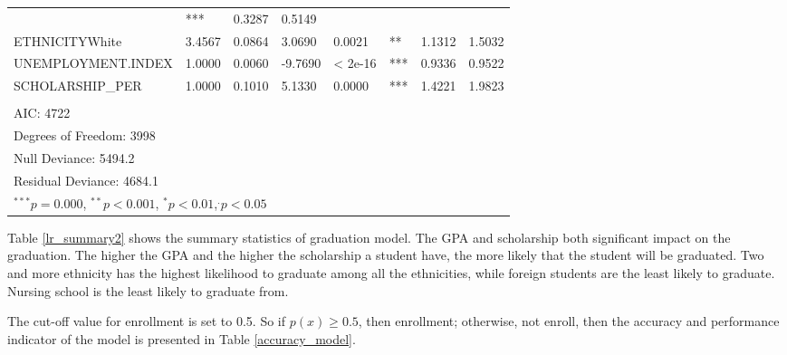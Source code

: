 \documentclass[12pt,english]{report}
\begin{document}
\begin{table}[]
\begin{adjustbox}{width=1.05\textwidth}
\begin{tabular}{llllllll}
& ***         & 0.3287 & 0.5149 \\
ETHNICITYWhite                  & 3.4567   & 0.0864     & 3.0690  & 0.0021     
& **          & 1.1312 & 1.5032 \\
UNEMPLOYMENT.INDEX              & 1.0000   & 0.0060     & -9.7690 & \textless
2e-16     & ***         & 0.9336 & 0.9522 \\
SCHOLARSHIP\_PER                & 1.0000   & 0.1010     & 5.1330  & 0.0000     
& ***         & 1.4221 & 1.9823    \\
\\
AIC: 4722\\
Degrees of Freedom: 3998 \\
Null Deviance:      5494.2 \\
Residual Deviance: 4684.1
\\
\hline
\multicolumn{7}{l}{\scriptsize{$^{***} p=0.000$, $^{**} p<0.001$, $^*
p<0.01$,$^{.}p<0.05$}}

\end{tabular}
\end{adjustbox}
\end{table}


Table \ref{lr_summary2} shows the summary statistics of graduation model. The
GPA and scholarship both significant impact on the graduation. The higher the
GPA and the higher the scholarship a student have, the more likely that the
student will be graduated. Two and more ethnicity has the highest likelihood to
graduate among all the ethnicities, while foreign students are the least
likely to graduate. Nursing school is the least likely to graduate from. 



The cut-off value for enrollment is set to 0.5. So if  $p(x) \geq 0.5$, then
enrollment;  otherwise, not enroll, then the accuracy and performance indicator
of the model is presented in Table  \ref{accuracy_model}.  

\end{document}
